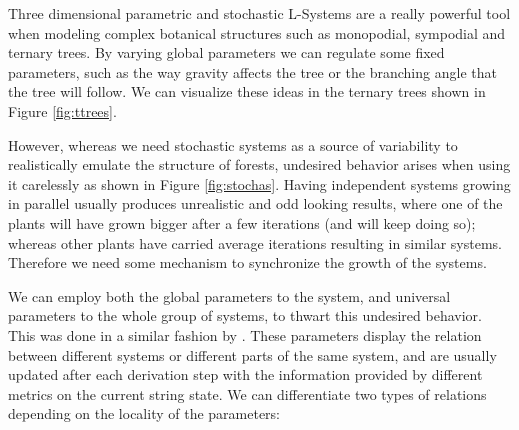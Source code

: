 \documentclass[letterpaper,twoside,11pt]{article}
\begin{document}
\begin{multicols}{2}
\label{sec:interdependence}

Three dimensional parametric and stochastic L-Systems are a really powerful tool when modeling complex botanical structures such as monopodial, sympodial and ternary trees. By varying global parameters we can regulate some fixed parameters, such as the way gravity affects the tree or the branching angle that the tree will follow. We can visualize these ideas in the ternary trees shown in Figure \ref{fig:ttrees}.


However, whereas we need stochastic systems as a source of variability to realistically emulate the structure of forests, undesired behavior arises when using it carelessly as shown in Figure \ref{fig:stochas}. Having independent systems growing in parallel usually produces unrealistic and odd looking results, where one of the plants will have grown bigger after a few iterations (and will keep doing so); whereas other plants have carried average iterations resulting in similar systems. Therefore we need some mechanism to synchronize the growth of the systems.

We can employ both the global parameters to the system, and universal parameters to the whole group of systems, to thwart this undesired behavior. This was done in a similar fashion by \cite{KurthSloboda2002}. These parameters display the relation between different systems or different parts of the same system, and are usually updated after each derivation step with the information provided by different metrics on the current string state. We can differentiate two types of relations depending on the locality of the parameters:



\end{multicols}
\end{document}
